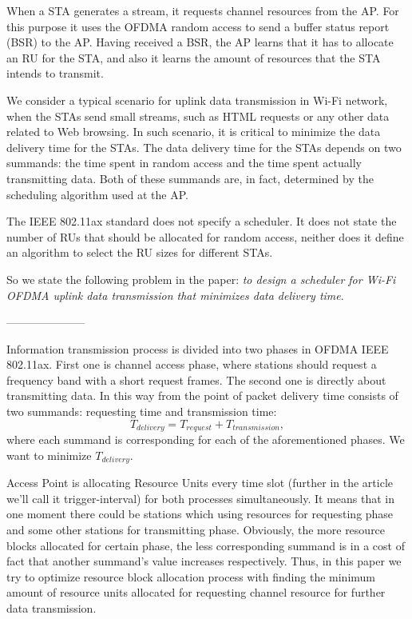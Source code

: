 When a STA generates a stream, it requests channel resources from the AP.
For this purpose it uses the OFDMA random access to send a buffer status report (BSR) to the AP.
Having received a BSR, the AP learns that it has to allocate an RU for the STA, and also it learns the amount of resources that the STA intends to transmit.

We consider a typical scenario for uplink data transmission in Wi-Fi network, when the STAs send small streams, such as HTML requests or any other data related to Web browsing.
In such scenario, it is critical to minimize the data delivery time for the STAs.
The data delivery time for the STAs depends on two summands: the time spent in random access and the time spent actually transmitting data.
Both of these summands are, in fact, determined by the scheduling algorithm used at the AP.

The IEEE 802.11ax standard does not specify a scheduler.
It does not state the number of RUs that should be allocated for random access, neither does it define an algorithm to select the RU sizes for different STAs.

So we state the following problem in the paper: \emph{to design a scheduler for Wi-Fi OFDMA uplink data transmission that minimizes data delivery time}.

---------------------

Information transmission process is divided into two phases in OFDMA IEEE 802.11ax. First one is channel access phase, where stations should request a frequency band with a short request frames. The second one is directly about transmitting data. In this way from the point of packet delivery time consists of two summands: requesting time and transmission time:
\[ T_{delivery} = T_{request} + T_{transmission}, \]
where each summand is corresponding for each of the aforementioned phases. We want to minimize $T_{delivery}$.

Access Point is allocating Resource Units every time slot (further in the article we'll call it trigger-interval) for both processes simultaneously. It means that in one moment there could be stations which using resources for requesting phase and some other stations for transmitting phase. Obviously, the more resource blocks allocated for certain phase, the less corresponding summand is in a cost of fact that another summand's value increases respectively. Thus, in this paper we try to optimize resource block allocation process with finding the minimum amount of resource units allocated for requesting channel resource for further data transmission.

